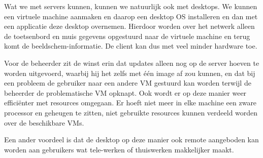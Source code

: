 Wat we met servers kunnen, kunnen we natuurlijk ook met desktops. We kunnen een virtuele machine aanmaken en daarop een desktop OS installeren en dan met een applicatie deze desktop overnemen. Hierdoor worden over het netwerk alleen de toetsenbord en muis gegevens opgestuurd naar de virtuele machine en terug komt de beeldschem-informatie. De client kan dus met veel minder hardware toe.

Voor de beheerder zit de winst erin dat updates alleen nog op de server hoeven te worden uitgevoerd, waarbij hij het zelfs met \'e\'en image af zou kunnen, en dat bij een probleem de gebruiker naar een andere VM gestuurd kan worden terwijl de beheerder de problematische VM opknapt. Ook wordt er op deze manier weer effici\"enter met resources omgegaan. Er hoeft niet meer in elke machine een zware processor en geheugen te zitten, niet gebruikte resources kunnen verdeeld worden over de beschikbare VMs.

Een ander voordeel is dat de desktop op deze manier ook remote aangeboden kan worden aan gebruikers wat tele-werken of thuiswerken makkelijker maakt.
